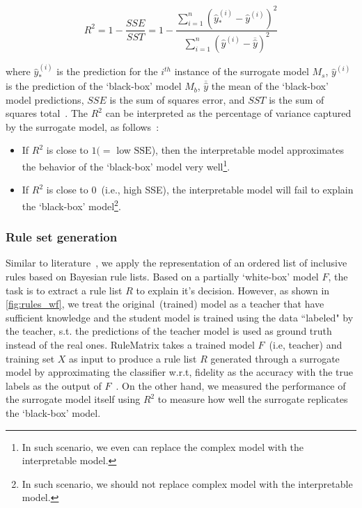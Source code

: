 \begin{equation}
    R^{2}=1-\frac{SSE}{SST}=1-\frac{\sum_{i=1}^{n}\left(\hat{y}_{*}^{(i)}-\hat{y}^{(i)}\right)^{2}}{\sum_{i=1}^{n}\left(\hat{y}^{(i)}-\overline{\hat{y}}\right)^{2}}
    \label{ew:r_squared}
\end{equation}

\hspace*{3.5mm} where $\hat{y}_{*}^{(i)}$ is the prediction for the $i^{th}$ instance of the surrogate model $M_s$, $\hat{y}^{(i)}$ is the prediction of the `black-box' model $M_b$, $\overline{\hat{y}}$ the mean of the `black-box' model predictions, $SSE$ is the sum of squares error, and $SST$ is the sum of squares total~\cite{molnar2019interpretable}. The $R^2$ can be interpreted as the percentage of variance captured by the surrogate model, as follows~\cite{molnar2019interpretable}:

\begin{itemize}[noitemsep]
    \item If $R^2$ is close to $1(=$ low $\mathrm{SSE}$), then the interpretable model approximates the behavior of the `black-box' model very well\footnote{In such scenario, we even can replace the complex model with the interpretable model.}. 
    \item If $R^2$ is close to 0~(i.e., high SSE), the interpretable model will fail to explain the `black-box' model\footnote{In such scenario, we should not replace  complex model with the interpretable model.}. 
\end{itemize}

\subsubsection{Rule set generation}
Similar to literature~\cite{ming2018rulematrix}, we apply the representation of an ordered list of inclusive rules based on Bayesian rule lists. Based on a partially `white-box' model ${F}$, the task is to extract a rule list $R$ to explain it's decision. However, as shown in \cref{fig:rules_wf}, we treat the original~(trained) model as a teacher that have sufficient knowledge and the student model is trained using the data ``labeled" by the teacher, s.t. the predictions of the teacher model is used as ground truth instead of the real ones. RuleMatrix takes a trained model ${F}$~(i.e, teacher) and training set $X$ as input to produce a rule list $R$ generated through a surrogate model by approximating the classifier  w.r.t, fidelity as the accuracy with the true labels as the output of ${F}$~\cite{ming2018rulematrix}. On the other hand, we measured the performance of the surrogate model itself using $R^2$ to measure how well the surrogate replicates the `black-box' model.    

